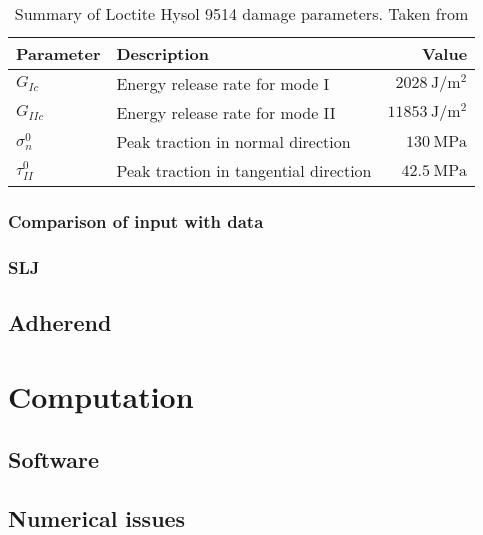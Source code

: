 \begin{table}
\begin{tabular}{llr}

 \toprule

 Parameter & Description & Value  \\

 \midrule

 $G_{Ic}$ & Energy release rate for mode I & $\SI{2028}{\J/\m^2}$ \\
 $G_{IIc}$ & Energy release rate for mode II & $\SI{11853}{\J/\m^2}$ \\
 $\sigma_{n}^{0}$ & Peak traction in normal direction & $\SI{130}{\MPa}$ \\
 $\tau_{II}^{0}$ & Peak traction in tangential direction & $\SI{42.5}{\MPa}$ \\

 \bottomrule

\end{tabular}
\caption{Summary of Loctite Hysol 9514 damage parameters. Taken from \citet{Scattina2011}}
\label{tab:ads_dmg_params}
\end{table}

\subsubsection{Comparison of input with \citet{ManufCatalog} data}

\subsubsection{\Gls{SLJ}}

\subsection{Adherend}

\section{Computation}

\subsection{Software}

\subsection{Numerical issues}

